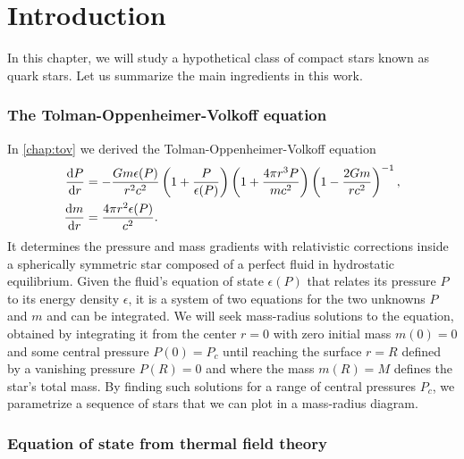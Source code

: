\chapter{Introduction}



In this chapter, we will study a hypothetical class of compact stars known as quark stars.
Let us summarize the main ingredients in this work.

\subsection{The Tolman-Oppenheimer-Volkoff equation}

In \cref{chap:tov} we derived the Tolman-Oppenheimer-Volkoff equation
\begin{subequations}
\begin{align}
	\odv{P}{r} &= -\frac{G m \epsilon(P)}{r^2 c^2} \left( 1 + \frac{P}{\epsilon(P)} \right) \left( 1 + \frac{4 \pi r^3 P}{m c^2} \right) \left( 1 - \frac{2 G m}{r c^2} \right)^{-1} , \\
	\odv{m}{r} &= \frac{4 \pi r^2 \epsilon(P)}{c^2} .
\end{align}
\end{subequations}
It determines the pressure and mass gradients with relativistic corrections inside a spherically symmetric star composed of a perfect fluid in hydrostatic equilibrium.
Given the fluid's equation of state $\epsilon(P)$ that relates its pressure $P$ to its energy density $\epsilon$, it is a system of two equations for the two unknowns $P$ and $m$ and can be integrated.
We will seek mass-radius solutions to the equation, obtained by integrating it from the center $r=0$ with zero initial mass $m(0) = 0$ and some central pressure $P(0) = P_c$ until reaching the surface $r=R$ defined by a vanishing pressure $P(R) = 0$ and where the mass $m(R) = M$ defines the star's total mass.
By finding such solutions for a range of central pressures $P_c$, we parametrize a sequence of stars that we can plot in a mass-radius diagram.

\subsection{Equation of state from thermal field theory}

